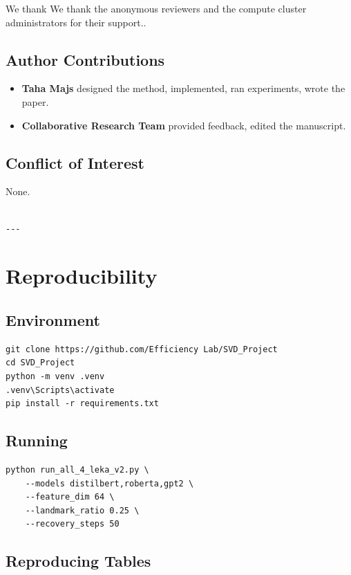 We thank We thank the anonymous reviewers and the compute cluster administrators for their support..

\subsection{Author Contributions}

\begin{itemize}
\item \textbf{Taha Majs} designed the method, implemented, ran experiments,
  wrote the paper.
\item \textbf{Collaborative Research Team} provided feedback, edited the manuscript.

\end{itemize}
\subsection{Conflict of Interest}

None.
\begin{lstlisting}

---
\end{lstlisting}

\section{Reproducibility}

\subsection{Environment}

\begin{lstlisting}
git clone https://github.com/Efficiency Lab/SVD_Project
cd SVD_Project
python -m venv .venv
.venv\Scripts\activate
pip install -r requirements.txt
\end{lstlisting}

\subsection{Running}

\begin{lstlisting}
python run_all_4_leka_v2.py \
    --models distilbert,roberta,gpt2 \
    --feature_dim 64 \
    --landmark_ratio 0.25 \
    --recovery_steps 50
\end{lstlisting}

\subsection{Reproducing Tables}

